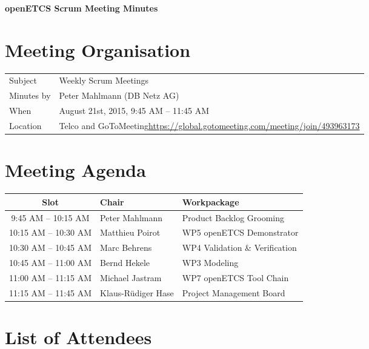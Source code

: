 \documentclass[a4paper, 11pt]{article}
\begin{document}
{\begin{center}\huge\bf openETCS Scrum Meeting Minutes\end{center}}

\section{Meeting Organisation}

\renewcommand{\arraystretch}{1.5}
\begin{supertabular}{m{.2\textwidth}m{.8\textwidth}}
Subject & Weekly Scrum Meetings\\
Minutes by & Peter Mahlmann (DB Netz AG)\\
When & August 21st, 2015, 9:45 AM -- 11:45 AM\\
Location & Telco and GoToMeeting\newline \url{https://global.gotomeeting.com/meeting/join/493963173}\\
\end{supertabular}

\renewcommand{\arraystretch}{1.0}
\section{Meeting Agenda}

\begin{tabular}{cll}
\toprule
\textbf{Slot} &  \textbf{Chair} & \textbf{Workpackage} \\
\midrule 
9:45 AM -- 10:15 AM & Peter Mahlmann & Product Backlog Grooming  \\
10:15 AM -- 10:30 AM & Matthieu Poirot & WP5 openETCS Demonstrator \\  
10:30 AM -- 10:45 AM & Marc Behrens & WP4 Validation \& Verification \\
10:45 AM -- 11:00 AM & Bernd Hekele & WP3 Modeling \\
11:00 AM -- 11:15 AM & Michael Jastram  & WP7 openETCS Tool Chain \\
11:15 AM -- 11:45 AM & Klaus-R\"udiger Hase & Project Management Board \\
\bottomrule
\end{tabular}

\section{List of Attendees}
\end{document}
